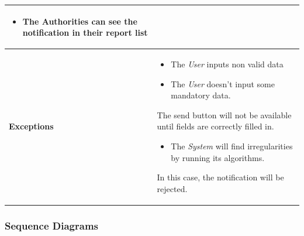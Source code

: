 \begin{table}[ht]
\begin{tabular}{|l|p{}|}
\begin{itemize}
 \item The Authorities can see the notification in their report list
 \end{itemize}\\ \hline

\textbf{Exceptions} &    \begin{itemize}
    \item The \textit{User} inputs non valid data
    \item The \textit{User} doesn't input some mandatory data.

\end{itemize}
The send button will not be available until fields are correctly filled in.

\begin{itemize}
    \item The \textit{System} will find irregularities by running its algorithms.
\end{itemize}
In this case, the notification will be rejected.     
                           \\ \hline

\end{tabular}
\end{table}







    \subsubsection{Sequence Diagrams}
    
